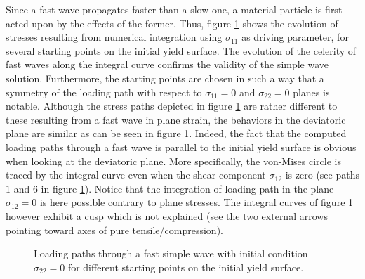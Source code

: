 Since a fast wave propagates faster than a slow one, a material particle is first acted upon by the effects of the former. 
Thus, figure \ref{fig:fast_path_plane_strains} shows the evolution of stresses resulting from numerical integration using $\sigma_{11}$ as driving parameter, for several starting points on the initial yield surface.
The evolution of the celerity of fast waves along the integral curve confirms the validity of the simple wave solution.
Furthermore, the starting points are chosen in such a way that a symmetry of the loading path with respect to $\sigma_{11}=0$ and $\sigma_{22}=0$ planes is notable.
Although the stress paths depicted in figure \ref{fig:fast_path_plane_strains} are rather different to these resulting from a fast wave in plane strain, the behaviors in the deviatoric plane are similar as can be seen in figure \ref{fig:fast_path_plane_strains}. 
Indeed, the fact that the computed loading paths through a fast wave is parallel to the initial yield surface is obvious when looking at the deviatoric plane.
More specifically, the von-Mises circle is traced by the integral curve even when the shear component $\sigma_{12}$ is zero (see paths $1$ and $6$ in figure \ref{fig:fast_path_plane_strains}).
Notice that the integration of loading path in the plane $\sigma_{12}=0$ is here possible contrary to plane stresses.
The integral curves of figure \ref{fig:fast_path_plane_strains} however exhibit a cusp which is not explained (see the two external arrows pointing toward axes of pure tensile/compression).
\begin{figure}[h!]
  \centering
  \caption{Loading paths through a fast simple wave with initial condition $\sigma_{22}=0$ for different starting points on the initial yield surface.}
  \label{fig:fast_path_plane_strains}
\end{figure}

